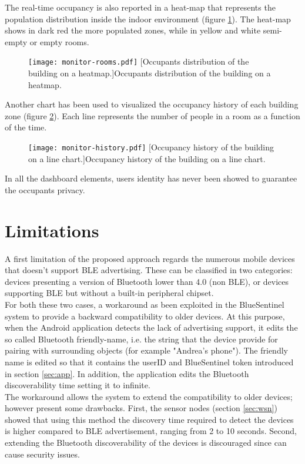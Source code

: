 The real-time occupancy is also reported in a heat-map that represents the population distribution inside the indoor environment (figure \ref{fig:monitor-rooms}). The heat-map shows in dark red the more populated zones, while in yellow and white semi-empty or empty rooms.

\begin{figure}[h!tb]
\center
\texttt{[image: monitor-rooms.pdf]}
[Occupants distribution of the building on a heatmap.]{Occupants distribution of the building on a heatmap.}
\label{fig:monitor-rooms}
\end{figure}

Another chart has been used to visualized the occupancy history of each building zone (figure \ref{fig:monitor-history}). Each line represents the number of people in a room as a function of the time.

\begin{figure}[h!tb]
\center
\texttt{[image: monitor-history.pdf]}
[Occupancy history of the building on a line chart.]{Occupancy history of the building on a line chart.}
\label{fig:monitor-history}
\end{figure}

In all the dashboard elements, users identity has never been showed to guarantee the occupants privacy.


\section{Limitations}
\label{sec:limitations}
A first limitation of the proposed approach regards the numerous mobile devices that doesn't support BLE advertising. These can be classified in two categories: devices presenting a version of Bluetooth lower than 4.0 (non BLE), or devices supporting BLE but without a built-in peripheral chipset.\\
For both these two cases, a workaround as been exploited in the BlueSentinel system to provide a backward compatibility to older devices. At this purpose, when the Android application detects the lack of advertising support, it edits the so called Bluetooth friendly-name, i.e. the string that the device provide for pairing with surrounding objects (for example "Andrea's phone"). The friendly name is edited so that it contains the userID and BlueSentinel token introduced in section \ref{sec:app}. In addition, the application edits the Bluetooth discoverability time setting it to infinite.\\
The workaround allows the system to extend the compatibility to older devices; however present some drawbacks. First, the sensor nodes (section \ref{sec:wsn}) showed that using this method the discovery time required to detect the devices is higher compared to BLE advertisement, ranging from 2 to 10 seconds. Second, extending the Bluetooth discoverability of the devices is discouraged since can cause security issues.

